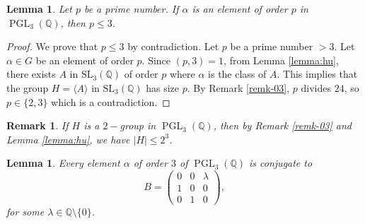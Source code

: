 \documentclass[leqno,12pt]{amsart} %
\newtheorem{lem}[thm]{Lemma}
\newtheorem{rmk}[thm]{Remark}
\newcommand{\Q}{\ensuremath{\mathbb{Q} }}
\DeclareMathOperator{\PGL}{PGL}
\begin{document}
\begin{lem}\label{Lemma:pgroup}
   Let $p$ be a prime number. If $\alpha$ is an element of order $p$ in $\PGL _3(\Q )$, then $p\le  3$. 
\end{lem}
\begin{proof}
   We prove that $p\le  3$ by contradiction. Let $p$ be a prime number $> 3$. Let $\alpha\in G$ be an element of order $p$. Since $(p,3)=1$, from Lemma \ref{lemma:hu}, there exists $A$ in $\mathrm{SL}_3(\Q )$ of order $p$ where $\alpha$ is the class of $A$. This implies that the group $H=\langle A\rangle$ in $\mathrm{SL}_3(\Q )$ has size $p$. By Remark \ref{remk-03}, $p$ divides $24$, so $p\in\{2,3\}$ which is a contradiction.
\end{proof}
 
\begin{rmk}\label{remk-04}
    If $H$ is a $2-$group in $\PGL _3(\Q )$, then by Remark \ref{remk-03} and Lemma \ref{lemma:hu}, we have $\mid H\mid \le  2^3$.
\end{rmk}
\begin{lem}\label{lemm-29}
Every element $\alpha$ of order $3$ of $\PGL _3(\Q )$ is conjugate to \[B=\left(\begin{matrix}
       0&0  & \lambda \\
          1&0  &0\\
           0&1 &0
    \end{matrix}\right),\]
    for some $\lambda\in\Q \setminus\{0\}$.
\end{lem}
\end{document}
